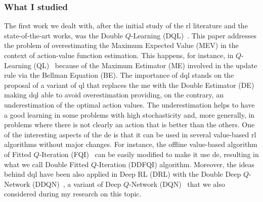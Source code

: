 \subsubsection{What I studied}
The first work we dealt with, after the initial study of the \gls{rl} literature and the state-of-the-art works, was the Double $Q$-Learning (DQL)~\cite{van2010double}. This paper addresses the problem of overestimating the Maximum Expected Value (MEV) in the context of action-value function estimation. This happens, for instance, in $Q$-Learning (QL)~\cite{smith2006optimizer} because of the Maximum Estimator (ME) involved in the update rule via the Bellman Equation (BE). The importance of \gls{dql} stands on the proposal of a variant of \gls{ql} that replaces the \gls{me} with the Double Estimator (DE) making \gls{dql} able to avoid overestimation providing, on the contrary, an underestimation of the optimal action values. The underestimation helps to have a good learning in some problems with high stochasticity and, more generally, in problems where there is not clearly an action that is better than the others. One of the interesting aspects of the \gls{de} is that it can be used in several value-based \gls{rl} algorithms without major changes. For instance, the offline value-based algorithm of Fitted $Q$-Iteration (FQI)~\cite{ernst2005tree} can be easily modified to make it use \gls{de}, resulting in what we call Double Fitted $Q$-Iteration (DDFQI) algorithm. Moreover, the ideas behind \gls{dql} have been also applied in Deep RL (DRL) with the Double Deep $Q$-Network (DDQN)~\cite{hasselt2015double}, a variant of Deep $Q$-Network (DQN)~\cite{mnih2015human} that we also considered during my research on this topic.

